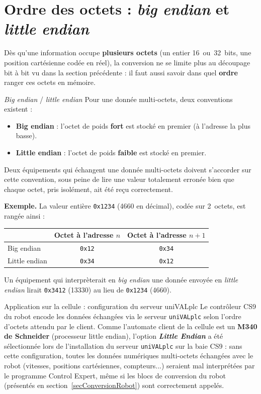 \section{Ordre des octets : \emph{big endian} et \emph{little endian}}
\label{secEndianness}

Dès qu'une information occupe \textbf{plusieurs octets} (un entier
16~ou~32~bits, une position cartésienne codée en réel), la conversion ne
se limite plus au découpage bit à bit vu dans la section précédente : il
faut aussi savoir dans quel \textbf{ordre} ranger ces octets en mémoire.

\begin{UPSTIinfor}{\emph{Big endian} / \emph{little endian}}
Pour une donnée multi-octets, deux conventions existent :
\begin{itemize}
    \item \textbf{Big endian} : l'octet de poids \textbf{fort} est stocké
    en premier (à l'adresse la plus basse).
    \item \textbf{Little endian} : l'octet de poids \textbf{faible} est
    stocké en premier.
\end{itemize}
Deux équipements qui échangent une donnée multi-octets doivent
s'accorder sur cette convention, sous peine de lire une valeur
totalement erronée bien que chaque octet, pris isolément, ait été reçu
correctement.
\end{UPSTIinfor}

\textbf{Exemple.} La valeur entière \texttt{0x1234} (4660 en décimal),
codée sur 2~octets, est rangée ainsi :

\begin{center}
\begin{tabular}{|l|c|c|}
\hline
 & \textbf{Octet à l'adresse $n$} & \textbf{Octet à l'adresse $n+1$} \\
\hline
Big endian & \texttt{0x12} & \texttt{0x34} \\
\hline
Little endian & \texttt{0x34} & \texttt{0x12} \\
\hline
\end{tabular}
\end{center}

Un équipement qui interprèterait en \emph{big endian} une donnée envoyée
en \emph{little endian} lirait \texttt{0x3412} (13330) au lieu de
\texttt{0x1234} (4660).

\begin{UPSTIinfor}{Application sur la cellule : configuration du serveur uniVALplc}
Le contrôleur CS9 du robot encode les données échangées via le serveur
\texttt{uniVALplc} selon l'ordre d'octets attendu par le client. Comme
l'automate client de la cellule est un \textbf{M340 de Schneider}
(processeur little endian), l'option \textbf{\emph{Little Endian}} a été
sélectionnée lors de l'installation du serveur \texttt{uniVALplc} sur la
baie CS9 : sans cette configuration, toutes les données numériques
multi-octets échangées avec le robot (vitesses, positions cartésiennes,
compteurs...) seraient mal interprétées par le programme Control Expert,
même si les blocs de conversion du robot (présentés en
section~\ref{secConversionRobot}) sont correctement appelés.
\end{UPSTIinfor}

